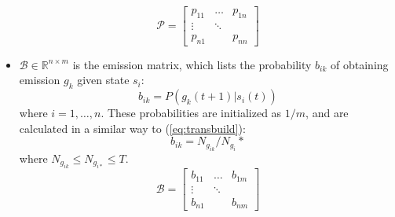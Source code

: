 \documentclass[letterpaper, 10 pt, conference]{ieeeconf}  %
\newcommand\NB[1]{$\spadesuit$\footnote{NB: #1}}
\begin{document}
\begin{itemize}
        \begin{equation}
            \mathcal{P} = 
                    \begin{bmatrix}
                        p_{11} & \dots & p_{1n} \\
                        \vdots & \ddots & \\
                        p_{n1} &    & p_{nn}
                    \end{bmatrix}
        \end{equation}
    \item $\mathcal{B}\in\mathbb{R}^{n\times m}$ is the emission matrix, which lists the probability $b_{ik}$ of obtaining emission $g_k$ given state $s_i$:
        \begin{equation} \label{eq:obsref}
            b_{ik} = P(g_k(t+1) \vert s_i(t))
        \end{equation}
        where $i = 1,\ldots,n$. These probabilities are initialized as $1/m$, and are calculated in a similar way to (\ref{eq:transbuild}):
        \begin{equation} \label{eq:obsbuild}
            b_{ik} = N_{g_{ik}}/N_{g_{i}}*
        \end{equation} 
        where $N_{g_{ik}} \leq N_{g_{i*}} \leq T$.
        \begin{equation}
            \mathcal{B} = 
                    \begin{bmatrix}
                        b_{11} & \dots & b_{1m} \\
                        \vdots & \ddots & \\
                        b_{n1} &    & b_{nm}
                    \end{bmatrix}
        \end{equation}
\end{itemize}
\end{document}
